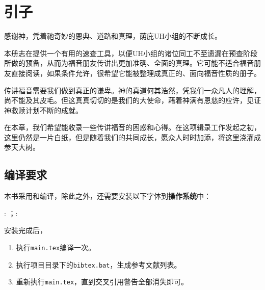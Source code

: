 \documentclass[Chinese,inNight]{CKBib}
\begin{document}
\clearpage

\thispagestyle{ruled}
\pagestyle{ruled}
\mainmatter

\chapter*{引子}


感谢神，凭着祂奇妙的恩典、道路和真理，荫庇UH小组的不断成长。

本册志在提供一个有用的速查工具，以便UH小组的诸位同工不至遗漏在预查阶段所做的预备，从而为福音朋友传讲出更加准确、全面的真理。它可能不适合福音朋友直接阅读，如果条件允许，很希望它能被整理成真正的、面向福音性质的册子。

传讲福音需要我们做到真正的谦卑。神的真道何其浩然，凭我们一众凡人的理解，尚不能及其皮毛。但这真真切切的是我们的大使命，藉着神满有恩慈的应许，见证神救赎计划不断的成就。

在本章，我们希望能收录一些传讲福音的困惑和心得。在这项辑录工作发起之初，这里仍然是一片白纸，但是随着我们的共同成长，愿众人时时加添，将这里浇灌成参天大树。

\section*{编译要求}

本书采用{\LaTeXe}和{\XeTeX}编译，除此之外，还需要安装以下字体到\textbf{操作系统}中：

\normalfont\selectfont: \href{https://blog.typekit.com/alternate/source-han-sans-chs/}{\Mundus}；\normalfont\selectfont: \href{https://source.typekit.com/source-han-serif/cn/}{\Mundus}

安装完成后，

\begin{enumerate}
  \item 执行\texttt{main.tex}编译一次。
  \item 执行项目目录下的\texttt{bibtex.bat}，生成参考文献列表。
  \item 重新执行\texttt{main.tex}，直到交叉引用警告全部消失即可。
\end{enumerate}
\end{document}
